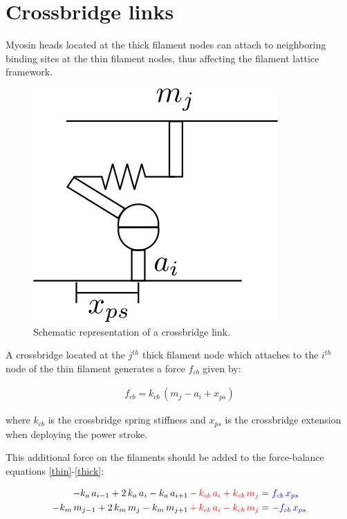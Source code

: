 \documentclass[a4paper,11pt]{article}
\begin{document}
\section{Crossbridge links}

Myosin heads located at the thick filament nodes can attach to neighboring binding sites at the thin filament nodes, thus affecting the filament lattice framework. 


\begin{figure}
\begin{center}
\includegraphics[scale=0.6]{Pictures/cb_link.png}
\caption{Schematic representation of a crossbridge link.}
\end{center}
\end{figure}


\noindent A crossbridge located at the $j^{th}$ thick filament node which attaches to the $i^{th}$ node of the thin filament generates a force $f_{cb}$ given by:

\begin{eqnarray}
f_{cb} = k_{cb} \, (m_j - a_i + x_{ps})
\label{matrix_cb}
\end{eqnarray}

\noindent where  $k_{cb}$ is the crossbridge spring stiffness and $x_{ps}$ is the crossbridge extension when deploying the power stroke.

\noindent This additional force on the filaments should be added to the force-balance equations \eqref{thin}-\eqref{thick}:


\begin{eqnarray}
-  k_a \, a_{i-1} + 2 \, k_a \, a_i - k_a \, a_{i+1} \, \color{red}{- \, k_{cb} \, a_i + k_{cb} \, m_j} &= \color{blue}{f_{cb} \, x_{ps}} \\
-  k_m \, m_{j-1} + 2 \, k_m \, m_j - k_m \, m_{j+1} \, \color{red}{+ \, k_{cb} \, a_i - k_{cb} \, m_j} &= \color{blue}{-f_{cb} \, x_{ps}} 
\label{thin_cb}
\end{eqnarray}
\end{document}
